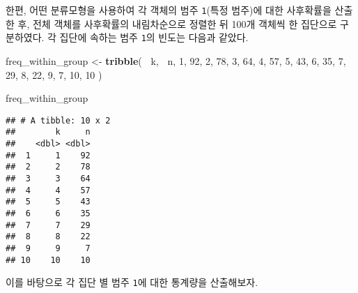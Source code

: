 \documentclass[]{book}
\newenvironment{Shaded}{\begin{snugshade}}{\end{snugshade}}
\newcommand{\DecValTok}[1]{\textcolor[rgb]{0.00,0.00,0.81}{#1}}
\newcommand{\KeywordTok}[1]{\textcolor[rgb]{0.13,0.29,0.53}{\textbf{#1}}}
\newcommand{\NormalTok}[1]{#1}
\newcommand{\OperatorTok}[1]{\textcolor[rgb]{0.81,0.36,0.00}{\textbf{#1}}}
\newcommand{\StringTok}[1]{\textcolor[rgb]{0.31,0.60,0.02}{#1}}
\begin{document}
한편, 어떤 분류모형을 사용하여 각 객체의 범주 \texttt{1}(특정 범주)에 대한 사후확률을 산출한 후, 전체 객체를 사후확률의 내림차순으로 정렬한 뒤 100개 객체씩 한 집단으로 구분하였다. 각 집단에 속하는 범주 \texttt{1}의 빈도는 다음과 같았다.

\begin{Shaded}
\begin{Highlighting}[]
\NormalTok{freq_within_group <-}\StringTok{ }\KeywordTok{tribble}\NormalTok{(}
  \OperatorTok{~}\NormalTok{k, }\OperatorTok{~}\NormalTok{n,}
  \DecValTok{1}\NormalTok{, }\DecValTok{92}\NormalTok{,}
  \DecValTok{2}\NormalTok{, }\DecValTok{78}\NormalTok{,}
  \DecValTok{3}\NormalTok{, }\DecValTok{64}\NormalTok{,}
  \DecValTok{4}\NormalTok{, }\DecValTok{57}\NormalTok{,}
  \DecValTok{5}\NormalTok{, }\DecValTok{43}\NormalTok{,}
  \DecValTok{6}\NormalTok{, }\DecValTok{35}\NormalTok{,}
  \DecValTok{7}\NormalTok{, }\DecValTok{29}\NormalTok{,}
  \DecValTok{8}\NormalTok{, }\DecValTok{22}\NormalTok{,}
  \DecValTok{9}\NormalTok{, }\DecValTok{7}\NormalTok{,}
  \DecValTok{10}\NormalTok{, }\DecValTok{10}
\NormalTok{)}

\NormalTok{freq_within_group}
\end{Highlighting}
\end{Shaded}

\begin{verbatim}
## # A tibble: 10 x 2
##        k     n
##    <dbl> <dbl>
##  1     1    92
##  2     2    78
##  3     3    64
##  4     4    57
##  5     5    43
##  6     6    35
##  7     7    29
##  8     8    22
##  9     9     7
## 10    10    10
\end{verbatim}

이를 바탕으로 각 집단 별 범주 \texttt{1}에 대한 통계량을 산출해보자.
\end{document}
